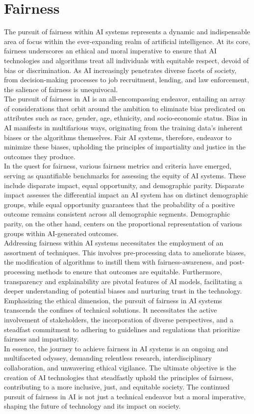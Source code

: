 \documentclass[12pt,a4paper,openright,twoside]{book}
\begin{document}
\section{Fairness} 
The pursuit of fairness within AI systems represents a dynamic and indispensable area of focus within the ever-expanding realm of artificial intelligence. At its core, fairness underscores an ethical and moral imperative to ensure that AI technologies and algorithms treat all individuals with equitable respect, devoid of bias or discrimination. As AI increasingly penetrates diverse facets of society, from decision-making processes to job recruitment, lending, and law enforcement, the salience of fairness is unequivocal. \\
The pursuit of fairness in AI is an all-encompassing endeavor, entailing an array of considerations that orbit around the ambition to eliminate bias predicated on attributes such as race, gender, age, ethnicity, and socio-economic status. Bias in AI manifests in multifarious ways, originating from the training data's inherent biases or the algorithms themselves. Fair AI systems, therefore, endeavor to minimize these biases, upholding the principles of impartiality and justice in the outcomes they produce. \\
In the quest for fairness, various fairness metrics and criteria have emerged, serving as quantifiable benchmarks for assessing the equity of AI systems. These include disparate impact, equal opportunity, and demographic parity. Disparate impact assesses the differential impact an AI system has on distinct demographic groups, while equal opportunity guarantees that the probability of a positive outcome remains consistent across all demographic segments. Demographic parity, on the other hand, centers on the proportional representation of various groups within AI-generated outcomes. \\
Addressing fairness within AI systems necessitates the employment of an assortment of techniques. This involves pre-processing data to ameliorate biases, the modification of algorithms to instill them with fairness-awareness, and post-processing methods to ensure that outcomes are equitable. Furthermore, transparency and explainability are pivotal features of AI models, facilitating a deeper understanding of potential biases and nurturing trust in the technology. \\
Emphasizing the ethical dimension, the pursuit of fairness in AI systems transcends the confines of technical solutions. It necessitates the active involvement of stakeholders, the incorporation of diverse perspectives, and a steadfast commitment to adhering to guidelines and regulations that prioritize fairness and impartiality. \\
In essence, the journey to achieve fairness in AI systems is an ongoing and multifaceted odyssey, demanding relentless research, interdisciplinary collaboration, and unwavering ethical vigilance. The ultimate objective is the creation of AI technologies that steadfastly uphold the principles of fairness, contributing to a more inclusive, just, and equitable society. The continued pursuit of fairness in AI is not just a technical endeavor but a moral imperative, shaping the future of technology and its impact on society.
\end{document}
